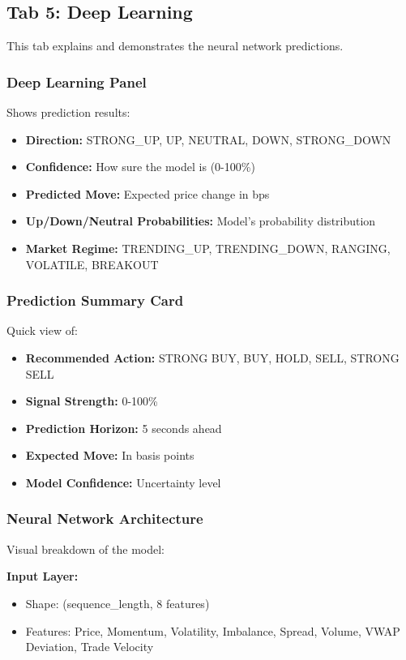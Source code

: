 \documentclass[12pt,a4paper]{article}
\begin{document}
\subsection{Tab 5: Deep Learning}

This tab explains and demonstrates the neural network predictions.

\subsubsection{Deep Learning Panel}
Shows prediction results:
\begin{itemize}
    \item \textbf{Direction:} STRONG\_UP, UP, NEUTRAL, DOWN, STRONG\_DOWN
    \item \textbf{Confidence:} How sure the model is (0-100\%)
    \item \textbf{Predicted Move:} Expected price change in bps
    \item \textbf{Up/Down/Neutral Probabilities:} Model's probability distribution
    \item \textbf{Market Regime:} TRENDING\_UP, TRENDING\_DOWN, RANGING, VOLATILE, BREAKOUT
\end{itemize}

\subsubsection{Prediction Summary Card}
Quick view of:
\begin{itemize}
    \item \textbf{Recommended Action:} STRONG BUY, BUY, HOLD, SELL, STRONG SELL
    \item \textbf{Signal Strength:} 0-100\%
    \item \textbf{Prediction Horizon:} 5 seconds ahead
    \item \textbf{Expected Move:} In basis points
    \item \textbf{Model Confidence:} Uncertainty level
\end{itemize}

\subsubsection{Neural Network Architecture}
Visual breakdown of the model:

\textbf{Input Layer:}
\begin{itemize}
    \item Shape: (sequence\_length, 8 features)
    \item Features: Price, Momentum, Volatility, Imbalance, Spread, Volume, VWAP Deviation, Trade Velocity
\end{itemize}
\end{document}
